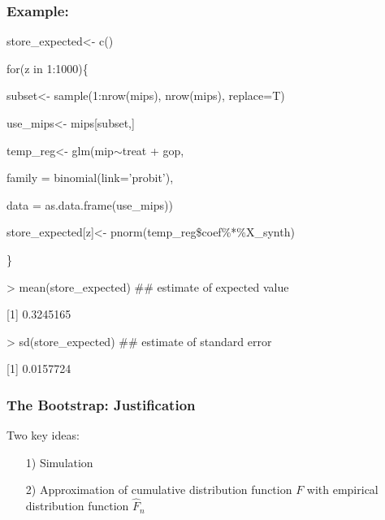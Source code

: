 \documentclass{beamer}
\begin{document}
\begin{frame}
\frametitle{Example: }

\begin{semiverbatim}
store\_expected<- c()

for(z in 1:1000)\{

\hspace{0.2in}	subset<- sample(1:nrow(mips), nrow(mips), replace=T)

\hspace{0.2in}	use\_mips<- mips[subset,]

\hspace{0.2in}	temp\_reg<- glm(mip$\sim$treat + gop, 

\hspace{0.4in}		family = binomial(link='probit'), 

\hspace{0.4in}		data = as.data.frame(use\_mips))

\hspace{0.2in}	store\_expected[z]<- pnorm(temp\_reg\$coef\%*\%X\_synth)

	\}

> mean(store\_expected) \#\# estimate of expected value

[1] 0.3245165

> sd(store\_expected) \#\# estimate of standard error

[1] 0.0157724
\end{semiverbatim}




\end{frame}


\begin{frame}
\frametitle{The Bootstrap: Justification} 
Two key ideas:
\begin{itemize}
\item[1)] Simulation
\item[2)] Approximation of cumulative distribution function $F$ with empirical distribution function $\hat{F}_{n}$
\end{itemize}


\end{frame}
\end{document}

